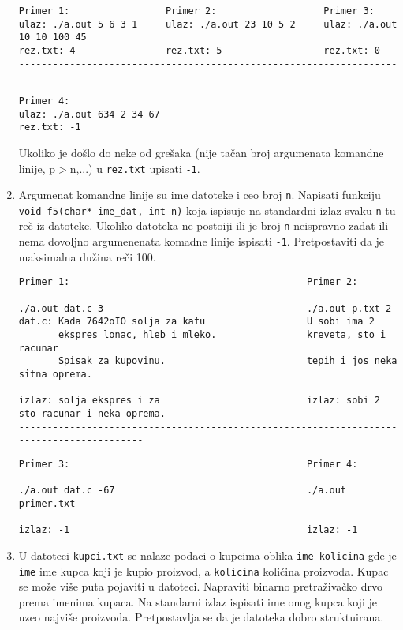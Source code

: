 \begin{enumerate}
\begin{verbatim}
Primer 1:                 Primer 2:                   Primer 3:
ulaz: ./a.out 5 6 3 1     ulaz: ./a.out 23 10 5 2     ulaz: ./a.out 10 10 100 45
rez.txt: 4                rez.txt: 5                  rez.txt: 0
----------------------------------------------------------------------------------------------------------------
\end{verbatim}

\begin{verbatim}
Primer 4:
ulaz: ./a.out 634 2 34 67
rez.txt: -1
\end{verbatim}

Ukoliko je do\v slo do neke od gre\v saka (nije ta\v can broj argumenata komandne linije, p$>$n,...)
u \verb|rez.txt| upisati \verb|-1|.

\item Argumenat komandne linije su ime datoteke i ceo broj \verb|n|.
Napisati funkciju \verb|void f5(char* ime_dat, int n)|
koja ispisuje na standardni izlaz svaku \verb|n|-tu re\v c iz datoteke.
Ukoliko datoteka ne postoiji ili je broj \verb|n| neispravno zadat ili
nema dovoljno argumenenata komadne linije ispisati \verb|-1|. Pretpostaviti
da je maksimalna du\v zina re\v ci 100.


\begin{verbatim}
Primer 1:                                          Primer 2:

./a.out dat.c 3                                    ./a.out p.txt 2
dat.c: Kada 7642oIO solja za kafu                  U sobi ima 2
       ekspres lonac, hleb i mleko.                kreveta, sto i racunar
       Spisak za kupovinu.                         tepih i jos neka sitna oprema.

izlaz: solja ekspres i za                          izlaz: sobi 2 sto racunar i neka oprema.
-----------------------------------------------------------------------------------------
\end{verbatim}

\begin{verbatim}
Primer 3:                                          Primer 4:

./a.out dat.c -67                                  ./a.out primer.txt

izlaz: -1                                          izlaz: -1
\end{verbatim}

\item U datoteci \verb|kupci.txt| se nalaze podaci o kupcima oblika \verb|ime kolicina| gde je \verb|ime| ime kupca
koji je kupio proizvod, a \verb|kolicina| koli\v cina proizvoda. Kupac se mo\v ze vi\v se puta pojaviti
u datoteci. Napraviti binarno pretra\v ziva\v cko drvo prema imenima kupaca. Na standarni izlaz ispisati
ime onog kupca koji je uzeo najvi\v se proizvoda. Pretpostavlja se da je datoteka dobro struktuirana.



\end{enumerate}
